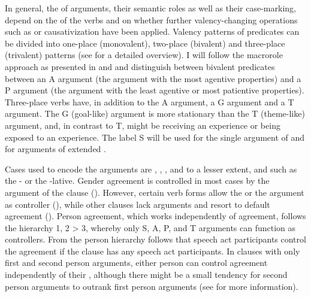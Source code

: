 In general, the  of arguments, their semantic roles as well as their case-marking, depend on the  of the verbs and on whether further valency-changing operations such as  or causativization have been applied. Valency patterns of predicates can be divided into one-place (monovalent), two-place (bivalent) and three-place (trivalent) patterns (see  for a detailed overview). I will follow the macrorole approach as presented in \citet{Bickel2011} and \citet{Bickel.etal2015} and distinguish between bivalent predicates between an A argument (the argument with the most agentive properties) and a P argument (the argument with the least agentive or most patientive properties). Three-place verbs have, in addition to the A argument, a G argument and a T argument. The G (goal-like) argument is more stationary than the T (theme-like) argument, and, in contrast to T, might be receiving an experience or being exposed to an experience. The label S will be used for the single argument of  and for  arguments of extended .

Cases used to encode the arguments are , , , and to a lesser extent,  and  such as the - or the -lative. Gender agreement is controlled in most cases by the  argument of the clause (). However, certain verb forms allow the  or the  argument as controller (), while other clauses lack  arguments and resort to default agreement (). Person agreement, which works  independently of  agreement, follows the hierarchy 1, 2 > 3, whereby only S, A, P, and T arguments can function as controllers. From the person hierarchy follows that speech act participants control the agreement if the clause has any speech act participants. In clauses with only first and second person arguments, either person can control agreement independently of their , although there might be a small tendency for second person arguments to outrank first person arguments (see  for more information).

